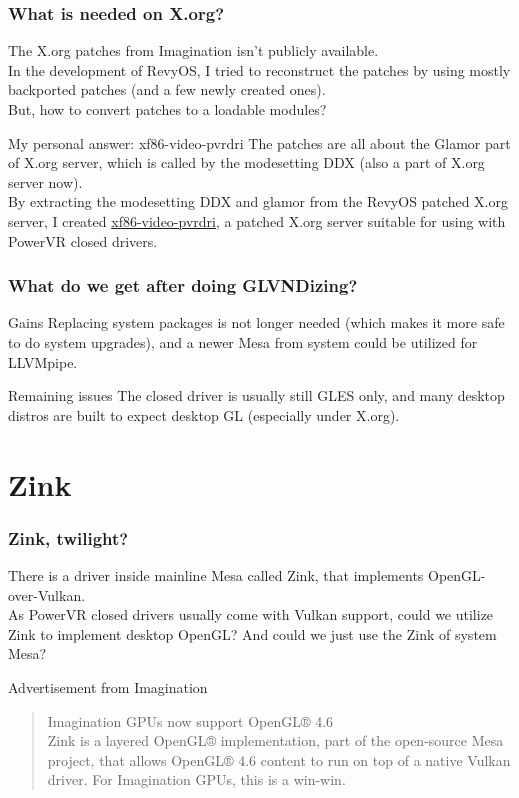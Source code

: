\documentclass{beamer}
\begin{document}
\begin{frame}
	\frametitle{What is needed on X.org?}
	The X.org patches from Imagination isn't publicly available. \\
	In the development of RevyOS, I tried to reconstruct the patches by using mostly backported patches (and a few newly created ones). \\
	But, how to convert patches to a loadable modules? \\
	\begin{block}{My personal answer: xf86-video-pvrdri}
		The patches are all about the Glamor part of X.org server, which is called by the modesetting DDX (also a part of X.org server now). \\
		By extracting the modesetting DDX and glamor from the RevyOS patched X.org server, I created \href{https://github.com/Icenowy/xf86-video-pvrdri}{xf86-video-pvrdri}, a patched X.org server suitable for using with PowerVR closed drivers.
	\end{block}
\end{frame}

\begin{frame}
	\frametitle{What do we get after doing GLVNDizing?}
	\begin{block}{Gains}
		Replacing system packages is not longer needed (which makes it more safe to do system upgrades), and a newer Mesa from system could be utilized for LLVMpipe.
	\end{block}
	\begin{block}{Remaining issues}
		The closed driver is usually still GLES only, and many desktop distros are built to expect desktop GL (especially under X.org).
	\end{block}
\end{frame}

\section{Zink}

\begin{frame}
	\frametitle{Zink, twilight?}
	There is a driver inside mainline Mesa called Zink, that implements OpenGL-over-Vulkan. \\
	As PowerVR closed drivers usually come with Vulkan support, could we utilize Zink to implement desktop OpenGL? And could we just use the Zink of system Mesa?
	\begin{block}{Advertisement from Imagination}
		\begin{quote}
			Imagination GPUs now support OpenGL® 4.6 \\
			Zink is a layered OpenGL® implementation, part of the open-source Mesa project, that allows OpenGL® 4.6 content to run on top of a native Vulkan driver. For Imagination GPUs, this is a win-win.
		\end{quote}
	\end{block}
\end{frame}
\end{document}
